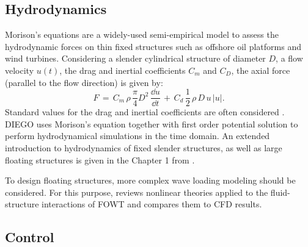 

\subsection{Hydrodynamics}

Morison's equations are a widely-used semi-empirical model to assess the hydrodynamic forces on thin fixed structures such as offshore oil platforms and wind turbines. 
Considering a slender cylindrical structure of diameter $D$, a flow velocity $u(t)$, the drag and inertial coefficients $C_m$ and $C_D$, the axial force (parallel to the flow direction) is given by:   
\begin{equation}
    F\,=\,C_{m}\,\rho \,{\frac {\pi }{4}}D^{2}\,{\frac{\dd u}{\dd t}}\,+\,C_{d}\,{\frac 12}\,\rho \,D\,u\,|u|.
\end{equation}
Standard values for the drag and inertial coefficients are often considered \citep{dnv_2013_offshore_design}. 
DIEGO uses Morison’s equation together with first order potential solution to perform hydrodynamical simulations in the time domain.
An extended introduction to hydrodynamics of fixed slender structures, as well as large floating structures is given in the Chapter 1 from \citep{milano_thesis_2021}.  

To design floating structures, more complex wave loading modeling should be considered. 
For this purpose, \citet{ronge_2023_hydrodynamics_fowt} reviews nonlinear theories applied to the fluid-structure interactions of FOWT and compares them to CFD results. 


\subsection{Control}

